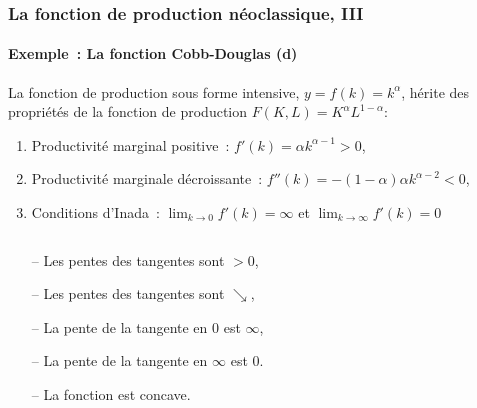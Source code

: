 \documentclass[10pt,notheorems]{beamer}
\theoremstyle{plain}
\theoremstyle{definition} %
\begin{document}
\begin{frame}
  \frametitle{La fonction de production néoclassique, III}
  \framesubtitle{Exemple~: La fonction Cobb-Douglas (d)}

  \medskip

  La fonction de production sous forme intensive, $y=f(k)=k^{\alpha}$, hérite des propriétés de la fonction de production $F(K,L)=K^{\alpha}L^{1-\alpha}$:

  \medskip

  \begin{enumerate}
  \item Productivité marginal positive~: $f'(k) = \alpha k^{\alpha-1}>0$,
  \item Productivité marginale décroissante~: $f''(k)= -(1-\alpha)\alpha k^{\alpha-2}<0$,
  \item Conditions d'Inada~: $\lim_{k\rightarrow 0} f'(k)=\infty$ et $\lim_{k\rightarrow \infty} f'(k)=0$
  \end{enumerate}

  \medskip

  \begin{columns}
    \begin{column}{0.6\textwidth}
      {\small
        \begin{itemize}
        \item[--] Les pentes des tangentes sont $>0$,
        \item[--] Les pentes des tangentes sont $\searrow$,
        \item[--] La pente de la tangente en 0 est $\infty$,
        \item[--] La pente de la tangente en $\infty$ est 0.
          \bigskip
        \item[--] La fonction est concave.
        \end{itemize}}
    \end{column}
    \begin{column}{0.4\textwidth}
    \end{column}
  \end{columns}

\end{frame}
\end{document}
